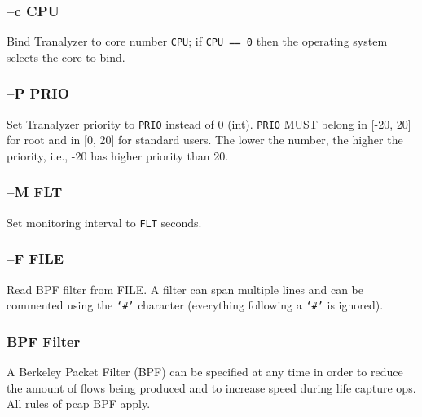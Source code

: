 \subsubsection{--c CPU}
Bind Tranalyzer to core number {\tt CPU}; if {\tt CPU == 0} then the operating system selects the core to bind.

\subsubsection{--P PRIO}
Set Tranalyzer priority to {\tt PRIO} instead of 0 (int).
{\tt PRIO} MUST belong in [-20, 20] for root and in [0, 20] for standard users.
The lower the number, the higher the priority, i.e., -20 has higher priority than 20.

\subsubsection{--M FLT}
Set monitoring interval to {\tt FLT} seconds.

\subsubsection{--F FILE}
Read BPF filter from FILE. A filter can span multiple lines and can be commented using the {\tt `\#'} character (everything following a {\tt `\#'} is ignored).

\subsubsection{BPF Filter}
A Berkeley Packet Filter (BPF) can be specified at any time in order to reduce the amount of flows being produced and to increase speed during life capture ops. All rules of pcap BPF apply.

